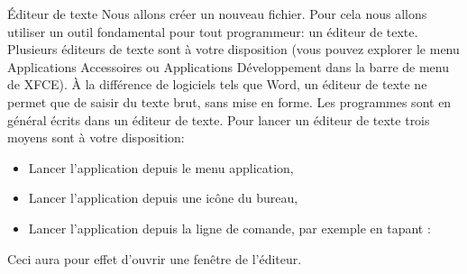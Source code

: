 \begin{exercice}
  \begin{exercicelet}{Éditeur de texte}
    Nous allons créer un nouveau fichier. Pour cela nous allons utiliser
    un outil fondamental pour tout programmeur: un éditeur de
    texte. Plusieurs éditeurs de texte sont à votre disposition (vous
    pouvez explorer le menu Applications \textrightarrow Accessoires ou
    Applications \textrightarrow Développement dans la barre de menu de
    XFCE).  À la différence de logiciels tels que Word, un éditeur de
    texte ne permet que de saisir du texte brut, sans mise en forme. Les
    programmes sont en général écrits dans un éditeur de texte.  Pour
    lancer un éditeur de texte trois moyens sont à votre disposition:
    \begin{itemize}
    \item Lancer l'application depuis le menu application,
    \item Lancer l'application depuis une icône du bureau,
    \item Lancer l'application depuis la ligne de comande, par exemple
      en tapant : 
    \end{itemize}
    Ceci aura pour effet d'ouvrir une fenêtre de l'éditeur.
  \end{exercicelet}
\end{exercice}
